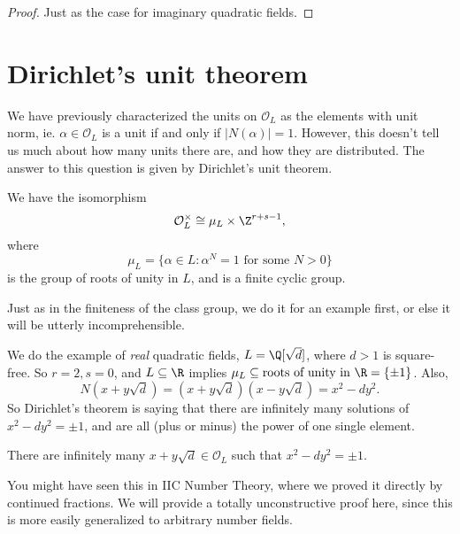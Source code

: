 \documentclass[a4paper]{article}
\begin{document}
\begin{proof}
  Just as the case for imaginary quadratic fields.
\end{proof}

\section{Dirichlet's unit theorem}
We have previously characterized the units on $\mathcal{O}_L$ as the elements with unit norm, ie. $\alpha \in \mathcal{O}_L$ is a unit if and only if $|N(\alpha)| = 1$. However, this doesn't tell us much about how many units there are, and how they are distributed. The answer to this question is given by Dirichlet's unit theorem.

\begin{thm}
  We have the isomorphism
  \[
    \mathcal{O}_L^\times \cong \mu_L \times \Z^{r + s - 1},
  \]
  where
  \[
    \mu_L = \{\alpha \in L: \alpha^N = 1\text{ for some }N > 0\}
  \]
  is the group of roots of unity in $L$, and is a finite cyclic group.
\end{thm}

Just as in the finiteness of the class group, we do it for an example first, or else it will be utterly incomprehensible.

We do the example of \emph{real} quadratic fields, $L = \Q[\sqrt{d}]$, where $d > 1$ is square-free. So $r = 2, s = 0$, and $L \subseteq \R$ implies $\mu_L \subseteq\text{roots of unity in }\R = \{\pm 1\}$. Also,
\[
  N(x + y\sqrt{d}) = (x + y\sqrt{d})(x - y\sqrt{d}) = x^2 - dy^2.
\]
So Dirichlet's theorem is saying that there are infinitely many solutions of $x^2 - dy^2 = \pm 1$, and are all (plus or minus) the power of one single element.

\begin{thm}
  There are infinitely many $x + y\sqrt{d} \in \mathcal{O}_L$ such that $x^2 - dy^2 = \pm 1$.
\end{thm}
You might have seen this in IIC Number Theory, where we proved it directly by continued fractions. We will provide a totally unconstructive proof here, since this is more easily generalized to arbitrary number fields.
\end{document}
